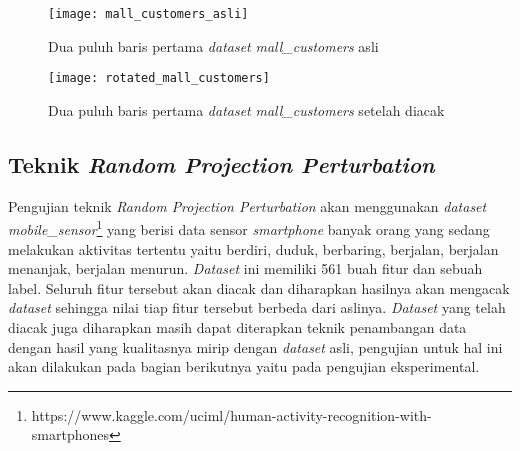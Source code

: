 \begin{figure}
	\centering
	\texttt{[image: mall\_customers\_asli]}
	\caption{Dua puluh baris pertama \textit{dataset} \textit{mall\_customers} asli}
	\label{fig:mall_customers_asli}
\end{figure}

\begin{figure}
	\centering
	\texttt{[image: rotated\_mall\_customers]}
	\caption{Dua puluh baris pertama \textit{dataset} \textit{mall\_customers} setelah diacak}
	\label{fig:rotated_mall_customers}
\end{figure}

\subsection{Teknik \textit{Random Projection Perturbation}}
\label{subsec:rpp-fungsional}

Pengujian teknik \textit{Random Projection Perturbation} akan menggunakan \textit{dataset} \textit{mobile\_sensor}\footnote{https://www.kaggle.com/uciml/human-activity-recognition-with-smartphones} yang berisi data sensor \textit{smartphone} banyak orang yang sedang melakukan aktivitas tertentu yaitu berdiri, duduk, berbaring, berjalan, berjalan menanjak, berjalan menurun. \textit{Dataset} ini memiliki 561 buah fitur dan sebuah label. Seluruh fitur tersebut akan diacak dan diharapkan hasilnya akan mengacak \textit{dataset} sehingga nilai tiap fitur tersebut berbeda dari aslinya. \textit{Dataset} yang telah diacak juga diharapkan masih dapat diterapkan teknik penambangan data dengan hasil yang kualitasnya mirip dengan \textit{dataset} asli, pengujian untuk hal ini akan dilakukan pada bagian berikutnya yaitu pada pengujian eksperimental.

